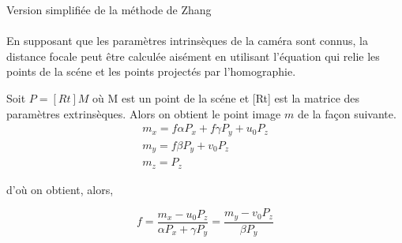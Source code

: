 \documentclass[a4paper,10pt]{article}
\begin{document}

\begin{paragraph}{Version simplifiée de la méthode de Zhang}~ \\
\\
En supposant que les paramètres intrinsèques de la caméra sont connus, la distance focale peut être calculée aisément en utilisant l'équation qui relie les points de la scéne et les points projectés par l'homographie.

Soit $P=[R t]M$ où M est un point de la scéne et [Rt] est la matrice des paramètres extrinsèques. Alors on obtient le point image $m$ de la façon suivante.
$$
 \begin{array}{c}
    m_x = f \alpha P_x +   f \gamma P_y +   u_0 P_z \\
    m_y = f \beta P_y +   v_0 P_z \\
    m_z = P_z
 \end{array}
$$

d'où on obtient, alors,

$$
f = \frac{m_x - u_0 P_z}{\alpha P_x + \gamma P_y} = \frac{m_y - v_0 P_z}{\beta P_y}
$$




\end{paragraph}  
\end{document}
